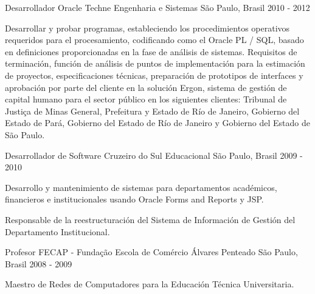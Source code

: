 \begin{cventries}
  \cventry
    {Desarrollador Oracle} %
    {Techne Engenharia e Sistemas} %
	{São Paulo, Brasil} %
    {2010 - 2012} %
    {
      \begin{cvitems} %
        \item {Desarrollar y probar programas, estableciendo los procedimientos operativos requeridos para el procesamiento, codificando como el Oracle PL / SQL, basado en definiciones proporcionadas en la fase de análisis de sistemas.
Requisitos de terminación, función de análisis de puntos de implementación para la estimación de proyectos, especificaciones técnicas, preparación de prototipos de interfaces y aprobación por parte del cliente en la solución Ergon, sistema de gestión de capital humano para el sector público en los siguientes clientes: Tribunal de Justiça de Minas General, Prefeitura y Estado de Río de Janeiro, Gobierno del Estado de Pará, Gobierno del Estado de Río de Janeiro y Gobierno del Estado de São Paulo.}
      \end{cvitems}
    }

  \cventry
    {Desarrollador de Software} %
    {Cruzeiro do Sul Educacional} %
    {São Paulo, Brasil} %
    {2009 - 2010} %
    {
      \begin{cvitems} %
        \item {Desarrollo y mantenimiento de sistemas para departamentos académicos, financieros e institucionales usando Oracle Forms and Reports y JSP.}
        \item {Responsable de la reestructuración del Sistema de Información de Gestión del Departamento Institucional.}
      \end{cvitems}
    }

  \cventry
    {Profesor} %
    {FECAP - Fundação Escola de Comércio Álvares Penteado} %
    {São Paulo, Brasil} %
    {2008 - 2009} %
    {
      \begin{cvitems} %
        \item {Maestro de Redes de Computadores para la Educación Técnica Universitaria.}
      \end{cvitems}
    }


\end{cventries}
